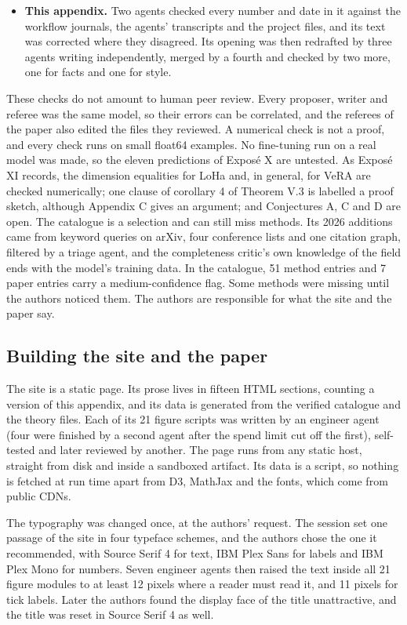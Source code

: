 \begin{itemize}
\item \textbf{This appendix.} Two agents checked every number and date in it against the workflow journals, the agents' transcripts and the project files, and its text was corrected where they disagreed. Its opening was then redrafted by three agents writing independently, merged by a fourth and checked by two more, one for facts and one for style.
\end{itemize}

These checks do not amount to human peer review. Every proposer, writer and referee was the same model, so their errors can be correlated, and the referees of the paper also edited the files they reviewed. A numerical check is not a proof, and every check runs on small float64 examples. No fine-tuning run on a real model was made, so the eleven predictions of Exposé X are untested. As Exposé XI records, the dimension equalities for LoHa and, in general, for VeRA are checked numerically; one clause of corollary 4 of Theorem V.3 is labelled a proof sketch, although Appendix C gives an argument; and Conjectures A, C and D are open. The catalogue is a selection and can still miss methods. Its 2026 additions came from keyword queries on arXiv, four conference lists and one citation graph, filtered by a triage agent, and the completeness critic's own knowledge of the field ends with the model's training data. In the catalogue, 51 method entries and 7 paper entries carry a medium-confidence flag. Some methods were missing until the authors noticed them. The authors are responsible for what the site and the paper say.

\subsection{Building the site and the paper}

The site is a static page. Its prose lives in fifteen HTML sections, counting a version of this appendix, and its data is generated from the verified catalogue and the theory files. Each of its 21 figure scripts was written by an engineer agent (four were finished by a second agent after the spend limit cut off the first), self-tested and later reviewed by another. The page runs from any static host, straight from disk and inside a sandboxed artifact. Its data is a script, so nothing is fetched at run time apart from D3, MathJax and the fonts, which come from public CDNs.

The typography was changed once, at the authors' request. The session set one passage of the site in four typeface schemes, and the authors chose the one it recommended, with Source Serif 4 for text, IBM Plex Sans for labels and IBM Plex Mono for numbers. Seven engineer agents then raised the text inside all 21 figure modules to at least 12 pixels where a reader must read it, and 11 pixels for tick labels. Later the authors found the display face of the title unattractive, and the title was reset in Source Serif 4 as well.

